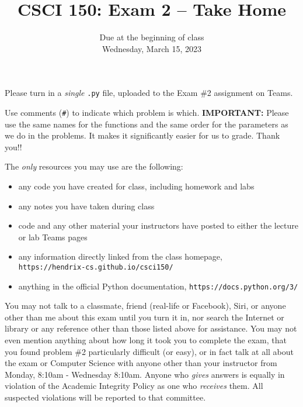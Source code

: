 \documentclass{article}
\begin{document}
\title{CSCI 150: Exam 2 -- Take Home}
\author{}
\date{Due at the beginning of class\\Wednesday, March 15, 2023}

\maketitle

\thispagestyle{empty}

Please turn in a \emph{single} \texttt{.py} file, uploaded to the Exam \#2 assignment on Teams.



Use comments (\verb|#|) to indicate which problem is
which. \textbf{IMPORTANT:} Please use the same names for the functions
and the same order for the parameters as we do in the problems. It makes it significantly easier for us to grade. Thank you!!

The \emph{only} resources you may use are the following:
\begin{itemize}
  \item  any code you have created for class, including homework and labs
  \item  any notes you have taken during class
  \item  code and any other material your instructors have posted to either the lecture or lab Teams pages
  \item  any information directly linked from the class homepage, \\ \texttt{https://hendrix-cs.github.io/csci150/}
  \item  anything in the official Python documentation, \texttt{https://docs.python.org/3/}
\end{itemize}

 You may not talk to a classmate, friend (real-life or Facebook), Siri, or anyone other than me about this exam until you turn it in, nor search the Internet or library or any reference other than those listed above for assistance.  You may not even mention anything about how long it took you to complete the exam, that you found problem \#2 particularly difficult (or easy), or in fact talk at all about the exam or Computer Science with anyone other than your instructor from Monday, 8:10am - Wednesday 8:10am.  Anyone who \emph{gives} answers is equally in violation of the Academic Integrity Policy as one who \emph{receives} them. All suspected violations will be reported to that committee.
\end{document}
